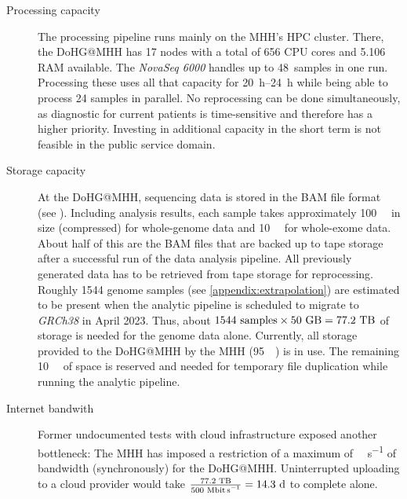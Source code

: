 \begin{description}
    \item[Processing capacity] The processing pipeline runs mainly on the \ac{MHH}'s \ac{HPC} cluster. There, the \ac{DoHG@MHH} has 17 nodes with a total of 656 CPU cores and \SI{5.106}{\tera\byte} RAM available. The \textit{NovaSeq 6000} handles up to \SI{48}{samples} in one run. Processing these uses all that capacity for \qtyrange{20}{24}{\hour} while being able to process 24 samples in parallel. No reprocessing can be done simultaneously, as diagnostic for current patients is time-sensitive and therefore has a higher priority. Investing in additional capacity in the short term is not feasible in the public service domain.
    
    \item[Storage capacity] At the \ac{DoHG@MHH}, sequencing data is stored in the BAM file format (see \autocite{Li2009}). Including analysis results, each sample takes approximately \SI{100}{\giga\byte} in size (compressed) for whole-genome data and \SI{10}{\giga\byte} for whole-exome data. About half of this are the BAM files that are backed up to tape storage after a successful run of the data analysis pipeline. All previously generated data has to be retrieved from tape storage for reprocessing. Roughly \num{1544} genome samples (see \cref{appendix:extrapolation}) are estimated to be present when the analytic pipeline is scheduled to migrate to \textit{GRCh38} in April 2023. Thus, about \(1544\text{ samples}\times50\text{ \unit{\giga\byte}}=77.2\text{ \unit{\tera\byte}}\) of storage is needed for the genome data alone. Currently, all storage provided to the \ac{DoHG@MHH} by the \ac{MHH} (\SI{95}{\tera\byte}) is in use. The remaining \SI{10}{\tera\byte} of space is reserved and needed for temporary file duplication while running the analytic pipeline.
    
    \item[Internet bandwith] Former undocumented tests with cloud infrastructure exposed another bottleneck: The \ac{MHH}  has imposed a restriction of a maximum of \unit{\mega\bit\per\second} of bandwidth (synchronously) for the \ac{DoHG@MHH}. Uninterrupted uploading to a cloud provider would take \(\frac{77.2\text{ \unit{\tera\byte}}}{500\text{ \unit{\mega\bit\per\second}}}=14.3\text{ \unit{\day}}\) to complete alone.
    

\end{description}
